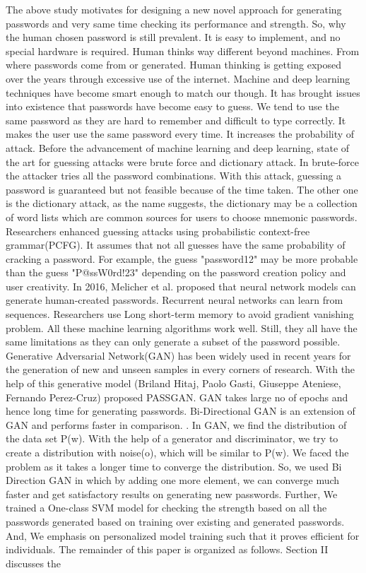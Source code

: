 \documentclass[runningheads]{llncs}
\begin{document}
The above study motivates for designing a new novel approach for generating passwords and very same time checking its performance and strength. So, why the human chosen password is still prevalent. It is easy to implement, and no special hardware is required. Human thinks way different beyond machines. From where passwords come from or generated. Human thinking is getting exposed over the years through excessive use of the internet. Machine and deep learning techniques have become smart enough to match our though. It has brought issues into existence that passwords have become easy to guess. We tend to use the same password as they are hard to remember and difficult to type correctly. It makes the user use the same password every time. It increases the probability of attack. Before the advancement of machine learning and deep learning, state of the art for guessing attacks were brute force and dictionary attack. In brute-force \cite{8400211} the attacker tries all the password combinations. With this attack, guessing a password is guaranteed but not feasible because of the time taken. The other one is the dictionary attack, as the name suggests, the dictionary may be a collection of word lists which are common sources for users to choose mnemonic passwords.\cite{8400211} Researchers enhanced guessing attacks using probabilistic context-free grammar(PCFG).\cite{5207658} It assumes that not all guesses have the same probability of cracking a password. For example, the guess "password12" may be more probable than the guess "P@ssW0rd!23" depending on the password creation policy and user creativity. In 2016, Melicher et al. proposed that neural network models can generate human-created passwords.\cite{197243} Recurrent neural networks can learn from sequences. Researchers use Long short-term memory to avoid gradient vanishing problem. \cite{DBLP:journals/corr/Lipton15} All these machine learning algorithms work well. Still, they all have the same limitations as they can only generate a subset of the password possible. Generative Adversarial Network(GAN) has been widely used in recent years for the generation of new and unseen samples in every corners of research. \cite{goodfellow2014generative} With the help of this generative model (Briland Hitaj, Paolo Gasti, Giuseppe Ateniese, Fernando Perez-Cruz) proposed PASSGAN.\cite{DBLP:journals/corr/abs-1709-00440} GAN takes large no of epochs and hence long time for generating passwords. Bi-Directional GAN is an extension of GAN and performs faster in comparison. \cite{DBLP:journals/corr/DonahueKD16}. In GAN, we find the distribution of the data set P(w). With the help of a generator and discriminator, we try to create a distribution with noise(o), which will be similar to P(w). We faced the problem as it takes a longer time to converge the distribution. So, we used Bi Direction GAN in which by adding one more element, we can converge much faster and get satisfactory results on generating new passwords. Further, We trained a One-class SVM model for checking the strength based on all the passwords generated based on training over existing and generated passwords. And, We emphasis on personalized model training such that it proves efficient for individuals. The remainder of this paper is organized as follows. Section II discusses the 
\end{document}
